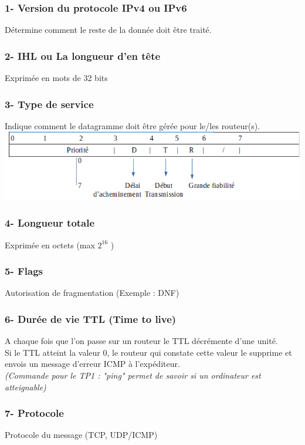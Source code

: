 \documentclass{article}
\begin{document}
\subsubsection*{1- Version du protocole IPv4 ou IPv6}
Détermine comment le reste de la donnée doit être traité. \\

\subsubsection*{2- IHL ou La longueur d’en tête}
Exprimée en mots de 32 bits

\subsubsection*{3- Type de service}
Indique comment le datagramme doit être gérée pour le/les routeur(s). \\
\includegraphics{Type.PNG}

\subsubsection*{4- Longueur totale}
Exprimée en octets (max $2^{16}$ )

\newpage
\subsubsection*{5- Flags}
Autorisation de fragmentation (Exemple : DNF)

\subsubsection*{6- Durée de vie TTL (Time to live)}
A chaque fois que l’on passe sur un routeur le TTL décrémente d’une unité. \\
Si le TTL atteint la valeur 0, le routeur qui constate cette valeur le supprime et envois un message d’erreur ICMP à l’expéditeur. \\
\textit{(Commande pour le TP1 : "ping" permet de savoir si un ordinateur est atteignable)}

\subsubsection*{7- Protocole}
Protocole du message (TCP, UDP/ICMP)
\end{document}
